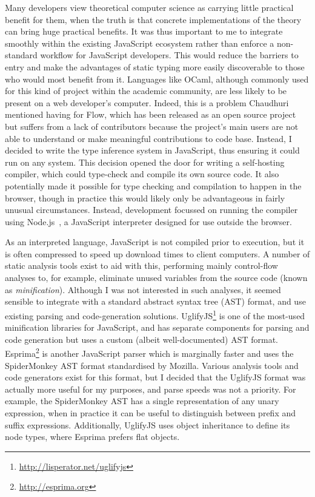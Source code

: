 \documentclass[12pt,a4paper,twoside,openright]{report}
\theoremstyle{definition}
\theoremstyle{dotless}
\begin{document}
Many developers view theoretical computer science as carrying little practical
benefit for them, when the truth is that concrete implementations of the theory
can bring huge practical benefits. It was thus important to me to integrate
smoothly within the existing JavaScript ecosystem rather than enforce a
non-standard workflow for JavaScript developers. This would reduce the barriers
to entry and make the advantages of static typing more easily discoverable to
those who would most benefit from it. Languages like OCaml, although commonly
used for this kind of project within the academic community, are less likely to be
present on a web developer's computer. Indeed, this is a problem Chaudhuri
mentioned having for Flow, which has been released as an open source project
but suffers from a lack of contributors because the project's main users are
not able to understand or make meaningful contributions to code base.
Instead, I decided to write the type inference system in JavaScript, thus
ensuring it could run on any system. This decision opened the door for writing
a self-hosting compiler, which could type-check and compile its own source
code. It also potentially made it possible for type checking and compilation to
happen in the browser, though in practice this would likely only be advantageous in
fairly unusual circumstances. Instead, development focussed on running the
compiler using Node.js~\cite{nodejs}, a JavaScript interpreter designed for use
outside the browser.

As an interpreted language, JavaScript is not compiled prior to execution, but
it is often compressed to speed up download times to client computers. A number
of static analysis tools exist to aid with this, performing mainly control-flow
analyses to, for example, eliminate unused variables from the source code
(known as \textit{minification}). Although I was not interested in such
analyses, it seemed sensible to integrate with a standard abstract syntax tree
(AST) format, and use existing parsing and code-generation solutions.
UglifyJS\footnote{\href{http://lisperator.net/uglifyjs}{http://lisperator.net/uglifyjs}} is one of the
most-used minification libraries for JavaScript, and has separate components
for parsing and code generation but uses a custom (albeit well-documented) AST
format. Esprima\footnote{\href{http://esprima.org}{http://esprima.org}} is another JavaScript parser
which is marginally faster and uses the SpiderMonkey AST format standardised by
Mozilla. Various analysis tools and code generators exist for this format, but
I decided that the UglifyJS format was actually more useful for my purposes,
and parse speeds was not a priority. For example, the SpiderMonkey AST has a
single representation of any unary expression, when in practice it can be
useful to distinguish between prefix and suffix expressions.  Additionally,
UglifyJS uses object inheritance to define its node types, where Esprima
prefers flat objects. 
\end{document}
